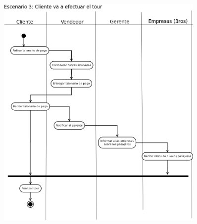\documentclass[12pt,a4paper,titlepage,oneside]{article}
\begin{document}
\begin{figure}[htb]
\centerline{\includegraphics[width=0.9\textwidth]{escenario3}}
\label{fig:celda}
\end{figure}
\end{document}
